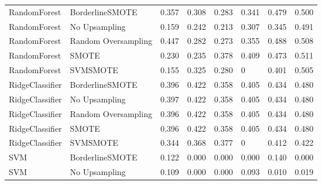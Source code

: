 \begin{tabular}{llllllll}
                RandomForest &     BorderlineSMOTE & 0.357 &                     0.308 &                 0.283 &                  0.341 &                                   0.479 &    0.500 \\
                RandomForest &       No Upsampling & 0.159 &                     0.242 &                 0.213 &                  0.307 &                                   0.345 &    0.491 \\
                RandomForest & Random Oversampling & 0.447 &                     0.282 &                 0.273 &                  0.355 &                                   0.488 &    0.508 \\
                RandomForest &               SMOTE & 0.230 &                     0.235 &                 0.378 &                  0.409 &                                   0.473 &    0.511 \\
                RandomForest &            SVMSMOTE & 0.155 &                     0.325 &                 0.280 &                      0 &                                   0.401 &    0.505 \\
             RidgeClassifier &     BorderlineSMOTE & 0.396 &                     0.422 &                 0.358 &                  0.405 &                                   0.434 &    0.480 \\
             RidgeClassifier &       No Upsampling & 0.397 &                     0.422 &                 0.358 &                  0.405 &                                   0.434 &    0.480 \\
             RidgeClassifier & Random Oversampling & 0.396 &                     0.422 &                 0.358 &                  0.405 &                                   0.434 &    0.480 \\
             RidgeClassifier &               SMOTE & 0.396 &                     0.422 &                 0.358 &                  0.405 &                                   0.434 &    0.480 \\
             RidgeClassifier &            SVMSMOTE & 0.344 &                     0.368 &                 0.377 &                      0 &                                   0.412 &    0.422 \\
                         SVM &     BorderlineSMOTE & 0.122 &                     0.000 &                 0.000 &                  0.000 &                                   0.140 &    0.000 \\
                         SVM &       No Upsampling & 0.109 &                     0.000 &                 0.000 &                  0.093 &                                   0.010 &    0.019 \\

\end{tabular}
